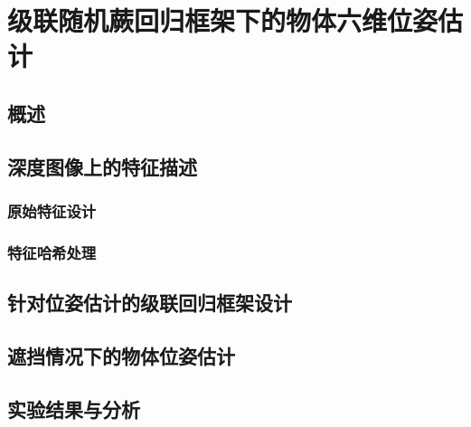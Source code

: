 \chapter{级联随机蕨回归框架下的物体六维位姿估计}

\section{概述}

\section{深度图像上的特征描述}
\subsection{原始特征设计} %
\subsection{特征哈希处理} %

\section{针对位姿估计的级联回归框架设计}

\section{遮挡情况下的物体位姿估计} %

\section{实验结果与分析} %
